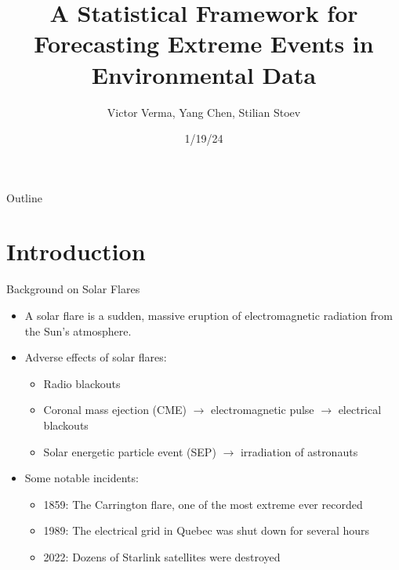 \documentclass{beamer}
\title[A Statistical Framework for Forecasting \ldots]{A Statistical Framework for \\ Forecasting Extreme Events in Environmental Data}
\author{Victor Verma, Yang Chen, Stilian Stoev}
\institute[]
{
Department of Statistics \\
University of Michigan
}
\date[1/19/24]{1/19/24}
\begin{document}
\begin{frame}
    \titlepage
\end{frame}

\begin{frame}{Outline}
   \tableofcontents
\end{frame}

\section{Introduction}

\begin{frame}{Background on Solar Flares}
    \begin{itemize}
        \item A solar flare is a sudden, massive eruption of electromagnetic radiation from the Sun's atmosphere.
        \item Adverse effects of solar flares: 
        \begin{itemize}
            \item Radio blackouts
            \item Coronal mass ejection (CME) $\rightarrow$ electromagnetic pulse $\rightarrow$ electrical blackouts
            \item Solar energetic particle event (SEP) $\rightarrow$ irradiation of astronauts
        \end{itemize}
        \item Some notable incidents:
        \begin{itemize}
            \item 1859: The Carrington flare, one of the most extreme ever recorded
            \item 1989: The electrical grid in Quebec was shut down for several hours
            \item 2022: Dozens of Starlink satellites were destroyed
        \end{itemize}
    \end{itemize}
\end{frame}
\end{document}
